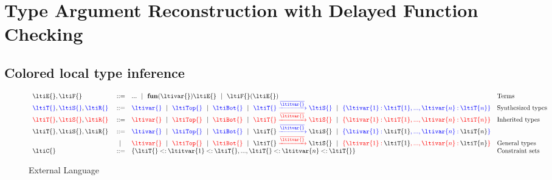 \chapter{Type Argument Reconstruction with Delayed Function Checking}
\label{chapter:symbolic:directed-lti}

\section{Colored local type inference}

\begin{figure}
$$
\begin{array}{lrll}
  \ltiE{}, \ltiF{} &::=& ... \alt
                         \ltiufun{\ltivar{}}{\ltiE{}} \alt
                         \ltiapp{\ltiF{}}{\ltiE{}}
                      &\mbox{Terms} \\
  \ltiSyn{\ltiT{}}, \ltiSyn{\ltiS{}}, \ltiSyn{\ltiR{}} &::=& 
                         \ltiSyn{\ltivar{}} \alt
                         \ltiSyn{\ltiTop{}} \alt
                         \ltiSyn{\ltiBot{}} \alt
                         \ltiSyn{\ltiArrow{\ltiT{}}{\overline{\ltitvar{}}}{\ltiS{}}} \alt
                         \ltiSyn{\ltiRec{\hastype{\ltivar{1}}{\ltiT{1}}, ..., \hastype{\ltivar{n}}{\ltiT{n}}}}
                      &\mbox{Synthesized types} \\
  \ltiChk{\ltiT{}}, \ltiChk{\ltiS{}}, \ltiChk{\ltiR{}} &::=& 
                         \ltiChk{\ltivar{}} \alt
                         \ltiChk{\ltiTop{}} \alt
                         \ltiChk{\ltiBot{}} \alt
                         \ltiChk{\ltiArrow{\ltiT{}}{\overline{\ltitvar{}}}{\ltiS{}}} \alt
                         \ltiChk{\ltiRec{\hastype{\ltivar{1}}{\ltiT{1}}, ..., \hastype{\ltivar{n}}{\ltiT{n}}}}
                      &\mbox{Inherited types} \\
  \ltiT{}, \ltiS{}, \ltiR{} &::=& 
                         \ltiSyn{\ltivar{}} \alt
                         \ltiSyn{\ltiTop{}} \alt
                         \ltiSyn{\ltiBot{}} \alt
                         \ltiSyn{\ltiArrow{\ltiSynChk{\ltiT{}}}{\overline{\ltitvar{}}}{\ltiSynChk{\ltiS{}}}} \alt
                         \ltiSyn{\ltiRec{\hastype{\ltivar{1}}{\ltiSynChk{\ltiT{1}}},
                                    ..., \hastype{\ltivar{n}}{\ltiSynChk{\ltiT{n}}}}}
                                    \\&\alt&
                         \ltiChk{\ltivar{}} \alt
                         \ltiChk{\ltiTop{}} \alt
                         \ltiChk{\ltiBot{}} \alt
                         \ltiChk{\ltiArrow{\ltiSynChk{\ltiT{}}}{\overline{\ltitvar{}}}{\ltiSynChk{\ltiS{}}}}
                         \alt
                         \ltiChk{\ltiRec{\hastype{\ltivar{1}}{\ltiSynChk{\ltiT{1}}},
                                    ..., \hastype{\ltivar{n}}{\ltiSynChk{\ltiT{n}}}}}
                      &\mbox{General types} \\
  \ltiC{} &::=& {\ltiCSet{\ltiCEntry{\ltiT{}}{\ltitvar{1}}{\ltiT{}}, ...,
                          \ltiCEntry{\ltiT{}}{\ltitvar{n}}{\ltiT{}}}}
                      &\mbox{Constraint sets} \\
\end{array}
$$
\caption{External Language}
\end{figure}

